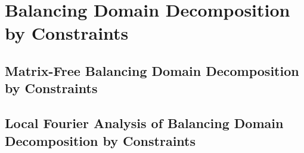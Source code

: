 \chapter{Balancing Domain Decomposition by Constraints}\label{ch:DomainDecomposition}


\section{Matrix-Free Balancing Domain Decomposition by Constraints}\label{sec:matrixfreebddc}


\section{Local Fourier Analysis of Balancing Domain Decomposition by Constraints}\label{sec:lfaofbddc}


